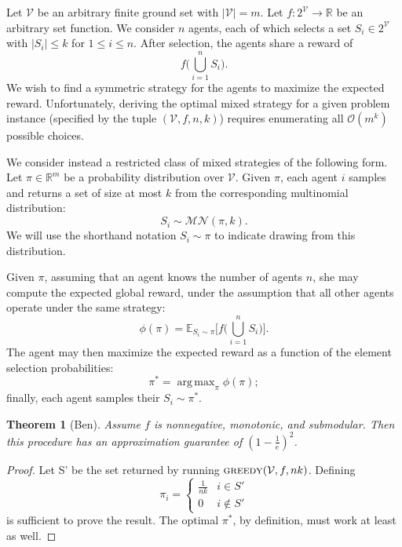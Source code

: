 \documentclass{article}
\newcommand{\cm}[1]{\mathcal{#1}}
\newcommand{\R}{\mathbb{R}}
\DeclareMathOperator*{\argmax}{arg\,max}
\newtheorem{thm}{Theorem}
\begin{document}
Let $\cm{V}$ be an arbitrary finite ground set with $\lvert \cm{V}
\rvert = m$.  Let $f\colon 2^{\cm{V}} \to \R$ be an arbitrary set
function.  We consider $n$ agents, each of which selects a set $S_i
\in 2^\cm{V}$ with $\lvert S_i \rvert \leq k$ for $1 \leq i \leq n$.
After selection, the agents share a reward of
\[
  f\biggl( \bigcup_{i = 1}^n S_i \biggr).
\]
We wish to find a symmetric strategy for the agents to maximize the
expected reward.  Unfortunately, deriving the optimal mixed strategy
for a given problem instance (specified by the tuple $(\cm{V}, f, n,
k)$) requires enumerating all $\cm{O}(m^k)$ possible choices.

We consider instead a restricted class of mixed strategies of the
following form. Let $\pi \in \R^m$ be a probability distribution over
$\cm{V}$.  Given $\pi$, each agent $i$ samples and returns a set of
size at most $k$ from the corresponding multinomial distribution:
\[
  S_i \sim \cm{MN}(\pi, k).
\]
We will use the shorthand notation $S_i \sim \pi$ to indicate drawing
from this distribution.

Given $\pi$, assuming that an agent knows the number of agents $n$,
she may compute the expected global reward, under the assumption
that all other agents operate under the same strategy:
\[
  \phi(\pi)
  =
  \mathbb{E}_{S_i \sim \pi}
  \Biggl[
    f\biggl( \bigcup_{i = 1}^n S_i \biggr)
  \Biggr].
\]
The agent may then maximize the expected reward as a function of
the element selection probabilities:
\[
  \pi^\ast
  =
  \argmax_\pi \phi(\pi);
\]
finally, each agent samples their $S_i \sim \pi^\ast$.

\begin{thm}[Ben]{Assume $f$ is nonnegative, monotonic, and submodular. Then
    this procedure has an approximation guarantee of $(1 - \frac{1}{e})^2$.}
\end{thm}
\begin{proof}
  Let S' be the set returned by running
  $\text{\textsc{greedy}}(\cm{V}, f, nk)$. Defining
  \[
    \pi_i =
    \begin{cases}
      \frac{1}{nk} & i \in S' \\
      0            & i \notin S'
    \end{cases}
  \]
  is sufficient to prove the result.  The optimal $\pi^\ast$, by
  definition, must work at least as well.
\end{proof}
\end{document}
